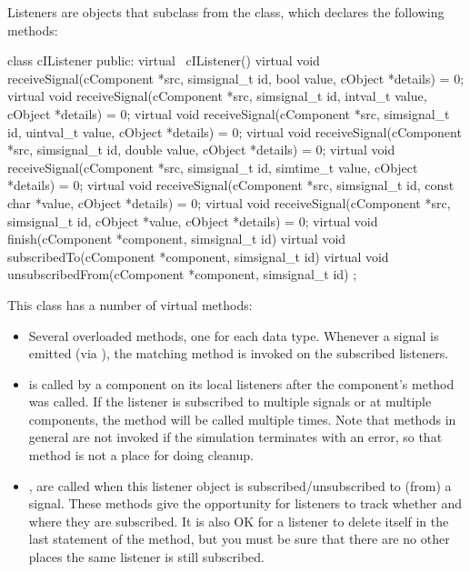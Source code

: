 Listeners are objects that subclass from the  class, which
declares the following methods:

\begin{cpp}
class cIListener
{
  public:
    virtual ~cIListener() {}
    virtual void receiveSignal(cComponent *src, simsignal_t id,
                               bool value, cObject *details) = 0;
    virtual void receiveSignal(cComponent *src, simsignal_t id,
                               intval_t value, cObject *details) = 0;
    virtual void receiveSignal(cComponent *src, simsignal_t id,
                               uintval_t value, cObject *details) = 0;
    virtual void receiveSignal(cComponent *src, simsignal_t id,
                               double value, cObject *details) = 0;
    virtual void receiveSignal(cComponent *src, simsignal_t id,
                               simtime_t value, cObject *details) = 0;
    virtual void receiveSignal(cComponent *src, simsignal_t id,
                               const char *value, cObject *details) = 0;
    virtual void receiveSignal(cComponent *src, simsignal_t id,
                               cObject *value, cObject *details) = 0;
    virtual void finish(cComponent *component, simsignal_t id) {}
    virtual void subscribedTo(cComponent *component, simsignal_t id) {}
    virtual void unsubscribedFrom(cComponent *component, simsignal_t id) {}
};
\end{cpp}

This class has a number of virtual methods:

\begin{itemize}
  \item Several overloaded  methods, one for each
    data type. Whenever a signal is emitted (via ), the matching
     method is invoked on the subscribed listeners.
  \item {} is called by a component on its local listeners
    after the component's  method was called. If the listener
    is subscribed to multiple signals or at multiple components, the method
    will be called multiple times. Note that  methods in general
    are not invoked if the simulation terminates with an error, so that method
    is not a place for doing cleanup.
  \item {},  are called
    when this listener object is subscribed/unsubscribed to (from) a signal.
    These methods give the opportunity for listeners to track whether
    and where they are subscribed. It is also OK for a listener to delete
    itself in the last statement of the  method,
    but you must be sure that there are no other places the same listener
    is still subscribed.
\end{itemize}

